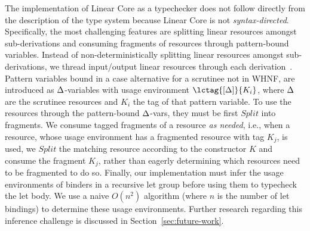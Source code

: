 \documentclass[acmsmall,review,anonymous]{acmart}
\begin{document}


The implementation of Linear Core as a typechecker does not follow
directly from the description of the type system because Linear Core
is not \emph{syntax-directed}. Specifically, the most challenging
features are splitting linear resources amongst sub-derivations and
consuming fragments of resources through pattern-bound variables.
Instead of non-deterministically splitting linear resources amongst
sub-derivations, we thread input/output linear resources through each
derivation~\cite{DBLP:journals/tcs/CervesatoHP00}.  Pattern variables
bound in a case alternative for a scrutinee not in WHNF, are
introduced as $\Delta$-variables with usage environment
$\lctag{\irr{\D}}{K_i}$, where $\Delta$ are the scrutinee resources and
$K_i$ the tag of that pattern variable. To use the resources through
the pattern-bound $\Delta$-vars, they must be first $Split$ into
fragments. We consume tagged fragments of a resource \emph{as needed},
i.e., when a resource, whose usage environment has a fragmented
resource with tag $K_j$, is used, we $Split$ the matching resource
according to the constructor $K$ and consume the fragment $K_j$,
rather than eagerly determining which resources need to be fragmented
to do so.
Finally, our implementation must infer the usage environments of binders in
a recursive let group before using them to typecheck the let body. We use a
naive $O(n^2)$ algorithm (where $n$ is the number of let bindings) to determine
these usage environments. Further research regarding
this inference challenge is discussed in Section~\ref{sec:future-work}.
%
%
%
%


\end{document}
